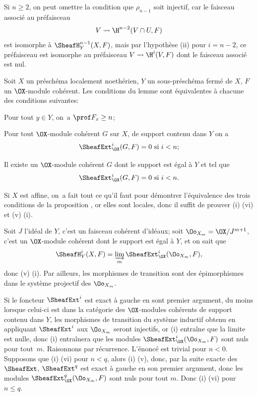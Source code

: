 \begin{remarque} \label{III.3.2}\pageoriginale
 Si $n\geq 2$, on peut omettre la condition que $\rho_{n-1}$ soit injectif, car le faisceau associ\'e au pr\'efaisceau
\[
V \rightsquigarrow \H^{n-2}(V\cap U, F)
\]
est isomorphe \`a $\SheafH_Y^{n-1} (X, F)$, mais par l'hypoth\`ese (ii) pour $i=n-2$, ce pr\'efaisceau est isomorphe au pr\'efaisceau $V \rightsquigarrow \H^i(V, F)$ dont le faisceau associ\'e est nul.
\end{remarque}

\begin{proposition} \label{III.3.3}
Soit $X$ un pr\'esch\'ema localement noeth\'erien, $Y$ un sous-pr\'esch\'ema ferm\'e de $X$, $F$ un $\OX$-module coh\'erent. Les conditions du lemme  sont \'equivalentes \`a chacune des conditions suivantes:
\begin{enumeratei}
\setcounter{enumi}{3}
\item
Pour tout $y\in Y$, on~a $\prof F_x \geq n$;

\item
Pour tout $\OX$-module coh\'erent $G$ sur $X$, de support contenu dans $Y$ on a
\[
\SheafExt_{\OX}^i(G, F)=0 \text{ si } i<n;
\]

\item
Il existe un $\OX$-module coh\'erent $G$ dont le support est \'egal \`a $Y$ et tel que
\[
\SheafExt_{\OX}^i(G, F)=0 \text{ si } i<n.
\]
\end{enumeratei}
\end{proposition}

Si $X$ est affine, on~a fait tout ce qu'il faut \ignorespaces pour d\'emontrer l'\'equivalence des trois conditions de la proposition ,  or elles sont locales, donc il suffit de prouver (i) \ALORS (vi) et (v) \ALORS (i).

Soit $J$ l'id\'eal de $Y$, c'est un faisceau coh\'erent d'id\'eaux; soit $\Oo_{X_m} = \OX/J^{m+1}$, c'est un $\OX$-module coh\'erent dont le support est \'egal \`a $Y$, et on sait \ignorespaces que
\[
\SheafH_Y^i(X, F) = \varinjlim_m \SheafExt_{\OX}^i(\Oo_{X_m}, F),
\]
donc (v) \ALORS (i). Par ailleurs\pageoriginale, les morphismes de transition sont des \'epimorphismes dans le syst\`eme projectif des $\Oo_{X_m}$.

Si le foncteur $\SheafExt^i$ est exact \`a gauche en sont premier argument, du moins lorsque celui-ci est dans la cat\'egorie des $\OX$-modules coh\'erents de support contenu dans $Y$, les morphismes de transition du syst\`eme inductif obtenu en appliquant $\SheafExt^i$ aux $\Oo_{X_m}$ seront injectifs, or (i) entra\^ine que la limite est nulle, donc (i) entra\^inera que les modules $\SheafExt_{\OX}^i(\Oo_{X_m}, F)$ sont nuls pour tout~$m$. Raisonnons par r\'ecurrence. L'\'enonc\'e est trivial pour $n<0$. Supposons que (i) \ALORS (vi) pour $n<q$, alors (i) \ALORS (v), donc, par la suite exacte des $\SheafExt$, $\SheafExt^q$ est exact \`a gauche en son premier argument, donc les modules $\SheafExt_{\OX}^q(\Oo_{X_m}, F)$ sont nuls pour tout $m$. Donc (i) \ALORS (vi) pour $n\leq q$.
\CQFD

